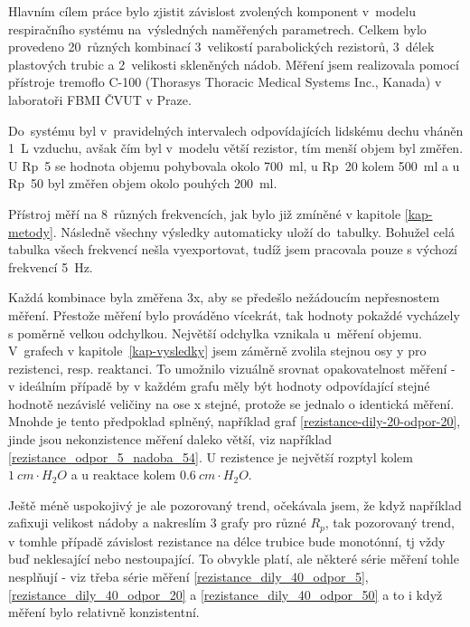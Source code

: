 
Hlavním cílem práce bylo zjistit závislost zvolených komponent v~modelu respiračního systému na~výsledných naměřených parametrech.  Celkem bylo provedeno 20~různých kombinací 3~velikostí parabolických rezistorů, 3~délek plastových trubic a 2~velikosti skleněných nádob. Měření jsem realizovala pomocí přístroje tremoflo C-100 (Thorasys Thoracic Medical Systems Inc., Kanada) v laboratoři FBMI ČVUT v Praze. 


Do~systému byl v~pravidelných intervalech odpovídajících lidskému dechu vháněn \SI{1}{L} vzduchu, avšak čím byl v~modelu větší rezistor,  tím menší objem byl změřen. U Rp~5 se hodnota objemu pohybovala okolo  \SI{700}{ml}, u Rp~20 kolem  \SI{500}{ml} a u Rp~50 byl změřen objem okolo pouhých \SI{200}{ml}.

Přístroj měří na 8~různých frekvencích, jak bylo již zmíněné v kapitole \ref{kap-metody}. Následně všechny výsledky automaticky uloží do~tabulky. 
Bohužel celá tabulka všech frekvencí nešla vyexportovat, tudíž jsem pracovala pouze s výchozí frekvencí  \SI{5}{Hz}. 

Každá kombinace byla změřena 3x, aby se předešlo nežádoucím nepřesnostem měření. Přestože měření bylo prováděno vícekrát, tak hodnoty pokaždé vycházely s poměrně velkou odchylkou. Největší odchylka vznikala u~měření objemu. 
V~grafech v kapitole~\ref{kap-vysledky} jsem záměrně zvolila stejnou osy y pro rezistenci, resp. reaktanci. To umožnilo vizuálně srovnat opakovatelnost měření -  v ideálním případě by v každém grafu měly být hodnoty odpovídající stejné hodnotě nezávislé veličiny na ose x stejné, protože se jednalo o identická měření. Mnohde je tento předpoklad splněný, například graf \ref{rezistance-dily-20-odpor-20}, jinde jsou nekonzistence měření daleko větší, viz například \ref{rezistance_odpor_5_nadoba_54}.
U rezistence je největší rozptyl kolem $\SI{1}{ cm\cdot H_{2}O}$ a u reaktace kolem $\SI{0,6}{ cm\cdot H_{2}O}$. 


Ještě méně uspokojivý je ale pozorovaný trend, očekávala jsem, že když například zafixuji velikost nádoby a nakreslím 3 grafy pro různé $R_p$, tak pozorovaný trend, v tomhle případě závislost rezistance na délce trubice bude monotónní, tj vždy buď neklesající nebo nestoupající. To obvykle platí, ale některé série měření tohle nesplňují - viz třeba série měření
\ref{rezistance_dily_40_odpor_5}, \ref{rezistance_dily_40_odpor_20} a \ref{rezistance_dily_40_odpor_50} a to i když měření bylo relativně konzistentní.


